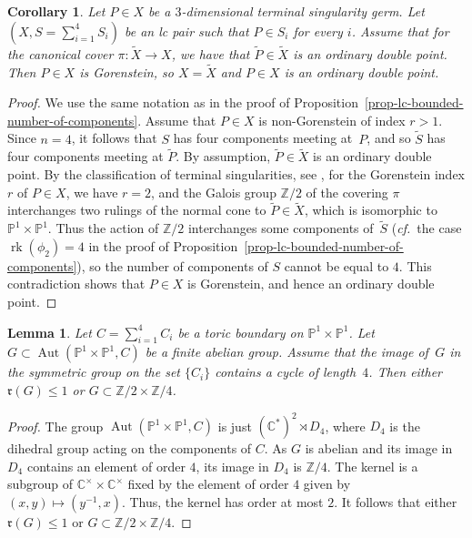 \documentclass[11pt]{amsart}
\numberwithin{equation}{section}
\newtheorem{corollary}[thm]{Corollary}
\newtheorem{lem}[thm]{Lemma}
\theoremstyle{definition}
\theoremstyle{remark}
\DeclareMathOperator{\Aut}{Aut}
\DeclareMathOperator{\rk}{rk}
\begin{document}
\begin{corollary}
\label{prop-lc-bounded-number-of-components-gorenstein}
Let $P\in X$ be a $3$-dimensional terminal singularity germ. 
Let $(X, S=\sum_{i=1}^4 S_i)$ be an lc pair such that $P \in S_i$ for every $i$. 
Assume that for the canonical cover $\pi\colon \widetilde{X}\to X$, we have that $\widetilde{P}\in\widetilde{X}$ is an ordinary double point. Then $P\in X$ is Gorenstein, so $X=\widetilde{X}$ and $P\in X$ is an ordinary double point.
\end{corollary}

\begin{proof}
We use the same notation as in the proof of Proposition~\ref{prop-lc-bounded-number-of-components}.
Assume that $P\in X$ is non-Gorenstein of index $r>1$. Since $n=4$, it follows that $S$ has four components meeting at~$P$, and so $\widetilde{S}$ has four components meeting at $\widetilde{P}$.
By assumption, $\widetilde{P}\in\widetilde{X}$ is an ordinary double point.  
By the classification of terminal singularities, see \cite[Section~6.1]{Re85}, for the Gorenstein index $r$ of $P\in X$, we have $r=2$, and the Galois group $\mathbb{Z}/2$ of the covering $\pi$ interchanges two rulings of the normal cone to $\widetilde{P}\in \widetilde{X}$, which is isomorphic to $\mathbb{P}^1\times\mathbb{P}^1$. Thus the action of $\mathbb{Z}/2$ interchanges some components of~$\widetilde{S}$ (\textit{cf.}~the case $\rk(\phi_2)=4$ in the proof of Proposition~\ref{prop-lc-bounded-number-of-components}), so the number of components of $S$ cannot be equal to $4$. This contradiction shows that $P\in X$ is Gorenstein, and hence an ordinary double point. 
\end{proof}

\begin{lem}
\label{lem-quadric-cyclic-permutation}
Let $C=\sum_{i=1}^4 C_i$ be a toric boundary on $\mathbb{P}^1\times\mathbb{P}^1$.  Let $G\subset \Aut(\mathbb{P}^1\times\mathbb{P}^1, C)$ be a finite abelian group.  Assume that the image of\, $G$ in the symmetric group on the set $\{C_i\}$ contains a cycle of length~$4$.  Then either $\mathfrak{r}(G)\leq 1$ or $G\subset \mathbb{Z}/2\times \mathbb{Z}/4$.
\end{lem}

\begin{proof}
The group $\Aut(\mathbb{P}^1 \times \mathbb{P}^1, C)$ is just $(\mathbb{C}^*)^2 \rtimes D_4$, where $D_4$ is the dihedral group acting on the components of $C$. As $G$ is abelian and its image in $D_4$ contains an element of order $4$, its image in $D_4$ is $\mathbb{Z}/4$. The kernel is a subgroup of $\mathbb{C}^\times \times \mathbb{C}^\times$ fixed by the element of order $4$ given by $(x, y) \mapsto (y^{-1},x)$. Thus, the kernel has order at most $2$. It follows that either $\mathfrak{r}(G)\leq 1$ or $G\subset \mathbb{Z}/2\times \mathbb{Z}/4$. 
\end{proof}
\end{document}
